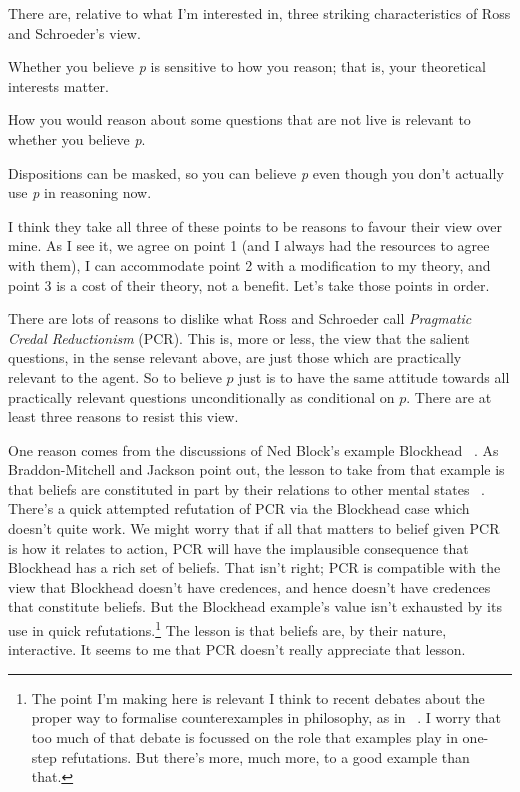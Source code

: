 \noindent There are, relative to what I'm interested in, three striking characteristics of Ross and Schroeder's view.

\begin{enumerate*}
\item Whether you believe \emph{p} is sensitive to how you reason; that is, your theoretical interests matter.

\item How you would reason about some questions that are not live is relevant to whether you believe \emph{p}.

\item Dispositions can be masked, so you can believe \emph{p} even though you don't actually use \emph{p} in reasoning now.

\end{enumerate*}
I think they take all three of these points to be reasons to favour their view over mine. As I see it, we agree on point 1 (and I always had the resources to agree with them), I can accommodate point 2 with a modification to my theory, and point 3 is a cost of their theory, not a benefit. Let's take those points in order.

There are lots of reasons to dislike what Ross and Schroeder call \emph{Pragmatic Credal Reductionism} (PCR). This is, more or less, the view that the salient questions, in the sense relevant above, are just those which are practically relevant to the agent. So to believe $p$ just is to have the same attitude towards all practically relevant questions unconditionally as conditional on $p$. There are at least three reasons to resist this view.

One reason comes from the discussions of Ned Block's example Blockhead ~\citep{Block1978}. As Braddon-Mitchell and Jackson point out, the lesson to take from that example is that beliefs are constituted in part by their relations to other mental states ~\citep[114ff]{DBMJackson2007}. There's a quick attempted refutation of PCR via the Blockhead case which doesn't quite work. We might worry that if all that matters to belief given PCR is how it relates to action, PCR will have the implausible consequence that Blockhead has a rich set of beliefs. That isn't right; PCR is compatible with the view that Blockhead doesn't have credences, and hence doesn't have credences that constitute beliefs. But the Blockhead example's value isn't exhausted by its use in quick refutations.\footnote{The point I'm making here is relevant I think to recent debates about the proper way to formalise counterexamples in philosophy, as in ~\citep{Williamson2007-WILTPO-17, IchikawaJarvis2009, Malmgren2011}. I worry that too much of that debate is focussed on the role that examples play in one-step refutations. But there's more, much more, to a good example than that.} The lesson is that beliefs are, by their nature, interactive. It seems to me that PCR doesn't really appreciate that lesson.

